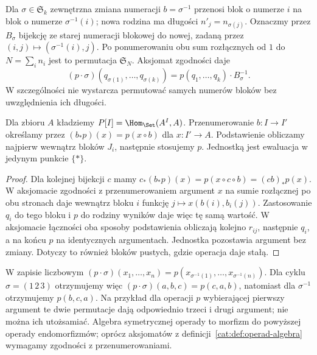 Dla $\sigma\in\mathfrak S_k$ zewnętrzna zmiana numeracji $b=\sigma^{-1}$ przenosi blok o numerze $i$ na blok o numerze $\sigma^{-1}(i)$; nowa rodzina ma długości $n'_j=n_{\sigma(j)}$. Oznaczmy przez $B_\sigma$ bijekcję ze starej numeracji blokowej do nowej, zadaną przez $(i,j)\mapsto(\sigma^{-1}(i),j)$. Po ponumerowaniu obu sum rozłącznych od $1$ do $N=\sum_i n_i$ jest to permutacja $\mathfrak S_N$. Aksjomat zgodności daje
\[
 (p\cdot\sigma)(q_{\sigma(1)},\ldots,q_{\sigma(k)})
 =p(q_1,\ldots,q_k)\cdot B_\sigma^{-1}.
\]
W szczególności nie wystarcza permutować samych numerów bloków bez uwzględnienia ich długości.

\begin{przyklad}\label{cat:ex:sym-end-operad}
Dla zbioru $A$ kładziemy $P[I]=\Hom_{\Set}(A^I,A)$. Przenumerowanie $b:I\to I'$ określamy przez $(b_*p)(x)=p(x\circ b)$ dla $x:I'\to A$. Podstawienie obliczamy najpierw wewnątrz bloków $J_i$, następnie stosujemy $p$. Jednostką jest ewaluacja w jedynym punkcie $\{*\}$.
\end{przyklad}
\begin{proof}
Dla kolejnej bijekcji $c$ mamy $c_*(b_*p)(x)=p(x\circ c\circ b)=(cb)_*p(x)$. W aksjomacie zgodności z przenumerowaniem argument $x$ na sumie rozłącznej po obu stronach daje wewnątrz bloku $i$ funkcję $j\mapsto x(b(i),b_i(j))$. Zastosowanie $q_i$ do tego bloku i $p$ do rodziny wyników daje więc tę samą wartość. W aksjomacie łączności oba sposoby podstawienia obliczają kolejno $r_{ij}$, następnie $q_i$, a na końcu $p$ na identycznych argumentach. Jednostka pozostawia argument bez zmiany. Dotyczy to również bloków pustych, gdzie operacja daje stałą.
\end{proof}
W zapisie liczbowym $(p\cdot\sigma)(x_1,\ldots,x_n)=p(x_{\sigma^{-1}(1)},\ldots,x_{\sigma^{-1}(n)})$. Dla cyklu $\sigma=(1\,2\,3)$ otrzymujemy więc $(p\cdot\sigma)(a,b,c)=p(c,a,b)$, natomiast dla $\sigma^{-1}$ otrzymujemy $p(b,c,a)$. Na przykład dla operacji $p$ wybierającej pierwszy argument te dwie permutacje dają odpowiednio trzeci i drugi argument; nie można ich utożsamiać. Algebra symetrycznej operady to morfizm do powyższej operady endomorfizmów; oprócz aksjomatów z definicji~\ref{cat:def:operad-algebra} wymagamy zgodności z przenumerowaniami.

